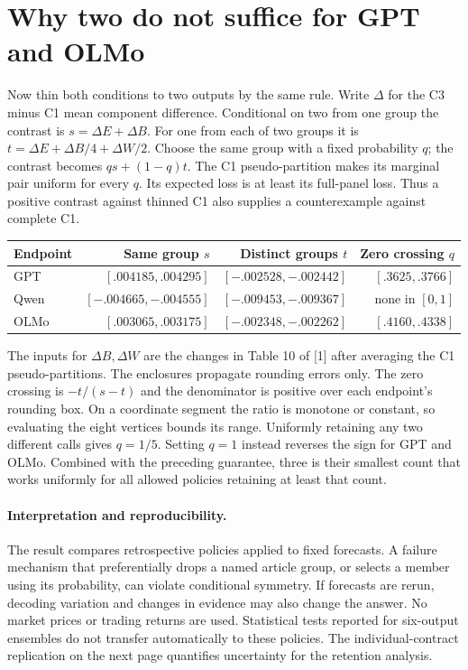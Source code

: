 \documentclass[11pt]{article}
\begin{document}
\section{Why two do not suffice for GPT and OLMo}
Now thin both conditions to two outputs by the same rule. Write $\Delta$ for the C3 minus C1 mean component difference. Conditional on two from one group the contrast is $s=\Delta E+\Delta B$. For one from each of two groups it is $t=\Delta E+\Delta B/4+\Delta W/2$. Choose the same group with a fixed probability $q$; the contrast becomes $qs+(1-q)t$. The C1 pseudo-partition makes its marginal pair uniform for every $q$. Its expected loss is at least its full-panel loss. Thus a positive contrast against thinned C1 also supplies a counterexample against complete C1.
\newpage
\begin{center}
\begin{tabular}{lrrr}
\toprule
Endpoint& Same group $s$ & Distinct groups $t$ & Zero crossing $q$\\
\midrule
GPT&$[.004185,.004295]$&$[-.002528,-.002442]$&$[.3625,.3766]$\\
Qwen&$[-.004665,-.004555]$&$[-.009453,-.009367]$&none in $[0,1]$\\
OLMo&$[.003065,.003175]$&$[-.002348,-.002262]$&$[.4160,.4338]$\\
\bottomrule
\end{tabular}
\end{center}
The inputs for $\Delta B,\Delta W$ are the changes in Table 10 of [1] after averaging the C1 pseudo-partitions. The enclosures propagate rounding errors only. The zero crossing is $-t/(s-t)$ and the denominator is positive over each endpoint's rounding box. On a coordinate segment the ratio is monotone or constant, so evaluating the eight vertices bounds its range. Uniformly retaining any two different calls gives $q=1/5$. Setting $q=1$ instead reverses the sign for GPT and OLMo. Combined with the preceding guarantee, three is their smallest count that works uniformly for all allowed policies retaining at least that count.

\paragraph{Interpretation and reproducibility.}
The result compares retrospective policies applied to fixed forecasts. A failure mechanism that preferentially drops a named article group, or selects a member using its probability, can violate conditional symmetry. If forecasts are rerun, decoding variation and changes in evidence may also change the answer. No market prices or trading returns are used. Statistical tests reported for six-output ensembles do not transfer automatically to these policies. The individual-contract replication on the next page quantifies uncertainty for the retention analysis.
\end{document}
